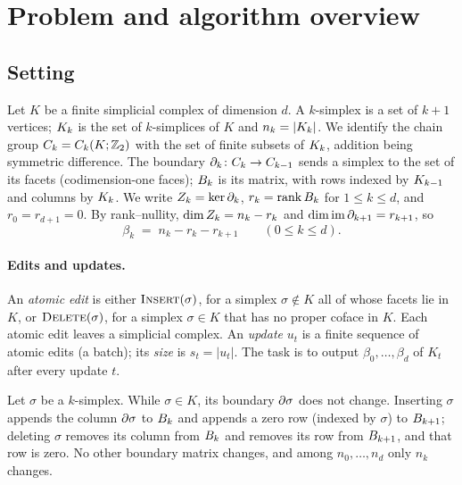 \section{Problem and algorithm overview}\label{sec:overview}

\subsection{Setting}\label{sec:setting}

Let $K$ be a finite simplicial complex of dimension $d$. A $k$-simplex is a set of
$k+1$ vertices; $K_{k}$ is the set of $k$-simplices of $K$ and $n_k=|K_{k}|$.
We identify the chain group $C_{k}=C_k(K;\mathbb{Z}_2)$ with the set of finite subsets of
$K_{k}$, addition being symmetric difference. The boundary
$\partial_k\colon C_{k}\to C_{k-1}$ sends a simplex to the set of its facets
(codimension-one faces); $B_{k}$ is its matrix, with rows indexed by
$K_{k-1}$ and columns by $K_{k}$. We write $Z_{k}=\ker\partial_k$,
$r_k=\operatorname{rank}B_{k}$ for $1\le k\le d$, and $r_0=r_{d+1}=0$. By rank--nullity,
$\dim Z_{k}=n_k-r_k$ and $\dim\operatorname{im}\partial_{k+1}=r_{k+1}$, so
\begin{equation}\label{eq:betti}
  \beta_k \;=\; n_k - r_k - r_{k+1}\qquad(0\le k\le d).
\end{equation}

\paragraph{Edits and updates.} An \emph{atomic edit} is either
$\textup{\textsc{Insert}}(\sigma)$, for a simplex $\sigma\notin K$ all of whose facets lie in $K$, or
$\textup{\textsc{Delete}}(\sigma)$, for a simplex $\sigma\in K$ that has no proper coface in $K$.
Each atomic edit leaves a simplicial complex. An \emph{update} $u_t$ is a finite
sequence of atomic edits (a batch); its \emph{size} is $s_t=|u_t|$. The task is
to output $\beta_0,\dots,\beta_d$ of $K_t$ after every update $t$.

\begin{observation}\label{obs:structural}
Let $\sigma$ be a $k$-simplex. While $\sigma\in K$, its boundary $\partial\sigma$ does
not change. Inserting $\sigma$ appends the column $\partial\sigma$ to $B_{k}$ and
appends a zero row (indexed by $\sigma$) to $B_{k+1}$; deleting $\sigma$
removes its column from $B_{k}$ and removes its row from $B_{k+1}$, and that
row is zero. No other boundary matrix changes, and among $n_0,\dots,n_d$ only
$n_k$ changes.
\end{observation}

